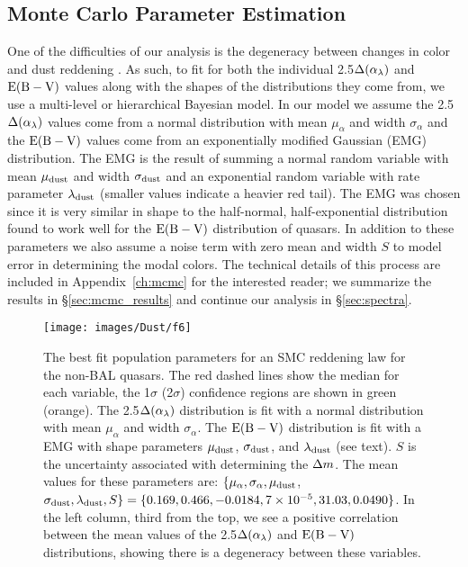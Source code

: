 \subsection{Monte Carlo Parameter Estimation} \label{sec:mcmc}
One of the difficulties of our analysis is the degeneracy between changes in color and dust reddening \citep[e.g., ][]{Richards:2003,Reichard:2003a,Reichard:2003b}.  As such, to fit for both the individual 2.5$\Delta(\alpha_{\lambda})$ and ${\rm E(B-V)}$ values along with the shapes of the distributions they come from, we use a multi-level or hierarchical Bayesian model.  In our model we assume the 2.5$\Delta(\alpha_{\lambda})$ values come from a normal distribution with mean $\mu_\alpha$ and width $\sigma_\alpha$ and the ${\rm E(B-V)}$ values come from an exponentially modified Gaussian (EMG) distribution.  The EMG is the result of summing a normal random variable with mean $\mu_{\rm dust}$ and width $\sigma_{\rm dust}$ and an exponential random variable with rate parameter $\lambda_{\rm dust}$ (smaller values indicate a heavier red tail).  The EMG was chosen since it is very similar in shape to the half-normal, half-exponential distribution \citet{Hopkins:2004} found to work well for the ${\rm E(B-V)}$ distribution of quasars. In addition to these parameters we also assume a noise term with zero mean and width $S$ to model error in determining the modal colors.
The technical details of this process are included in Appendix~\ref{ch:mcmc} for the interested reader; we summarize the results in \S\ref{sec:mcmc_results} and continue our analysis in \S\ref{sec:spectra}.  

\begin{figure*}
\begin{center}
\texttt{[image: images/Dust/f6]}
\caption[Best fit population parameters for non-BAL quasars]{\label{fig:mcmc_no_bal_tri} The best fit population parameters for an SMC reddening law for the non-BAL quasars. The red dashed lines show the median for each variable, the 1$\sigma$ (2$\sigma$) confidence regions are shown in green (orange).  The 2.5$\Delta(\alpha_{\lambda})$ distribution is fit with a normal distribution with mean $\mu_{\alpha}$ and width $\sigma_{\alpha}$. The ${\rm E(B-V)}$ distribution is fit with a EMG with shape parameters $\mu_{\rm dust}$, $\sigma_{\rm dust}$, and $\lambda_{\rm dust}$ (see text). $S$ is the uncertainty associated with determining the $\Delta m$.  
The mean values for these parameters are: $\{ \mu_{\alpha}, \sigma_{\alpha}, \mu_{\rm dust}$, $\sigma_{\rm dust} ,\lambda_{\rm dust}, S \}=\{ 0.169,0.466,-0.0184,7\times10^{-5},31.03,0.0490 \}$.
In the left column, third from the top, we see a positive correlation between the mean values of the 2.5$\Delta(\alpha_{\lambda})$ and ${\rm E(B-V)}$ distributions, showing there is a degeneracy between these variables.}
\end{center}
\end{figure*}

